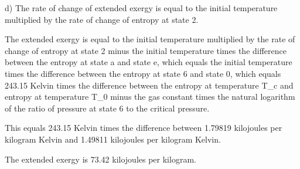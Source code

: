 d) The rate of change of extended exergy is equal to the initial temperature multiplied by the rate of change of entropy at state 2.

The extended exergy is equal to the initial temperature multiplied by the rate of change of entropy at state 2 minus the initial temperature times the difference between the entropy at state a and state e, which equals the initial temperature times the difference between the entropy at state 6 and state 0, which equals 243.15 Kelvin times the difference between the entropy at temperature T_c and entropy at temperature T_0 minus the gas constant times the natural logarithm of the ratio of pressure at state 6 to the critical pressure.

This equals 243.15 Kelvin times the difference between 1.79819 kilojoules per kilogram Kelvin and 1.49811 kilojoules per kilogram Kelvin.

The extended exergy is 73.42 kilojoules per kilogram.